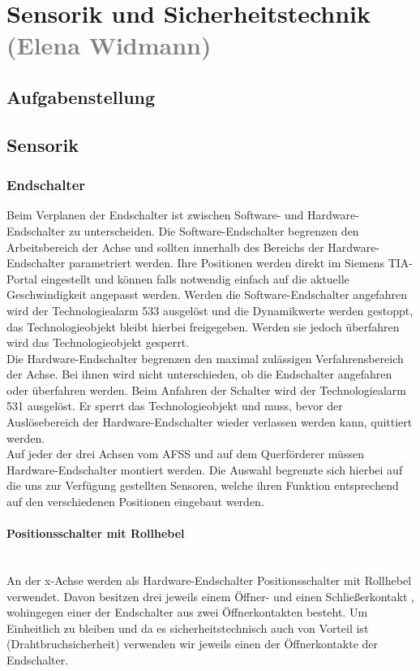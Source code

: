 \section{Sensorik und Sicherheitstechnik \textcolor{gray}{(Elena Widmann)}}

\subsection{Aufgabenstellung}

\subsection{Sensorik}

\subsubsection{Endschalter}
Beim Verplanen der Endschalter ist zwischen Software- und Hardware-Endschalter zu unterscheiden. Die Software-Endschalter begrenzen den Arbeitsbereich der Achse und sollten innerhalb des Bereichs der Hardware-Endschalter parametriert werden. Ihre Positionen werden direkt im Siemens TIA-Portal eingestellt und können falls notwendig einfach auf die aktuelle Geschwindigkeit angepasst werden. Werden die Software-Endschalter angefahren wird der Technologiealarm 533 ausgelöst und die Dynamikwerte werden gestoppt, das Technologieobjekt bleibt hierbei freigegeben. Werden sie jedoch überfahren wird das Technologieobjekt gesperrt. \\
Die Hardware-Endschalter begrenzen den maximal zulässigen Verfahrensbereich der Achse. Bei ihnen wird nicht unterschieden, ob die Endschalter angefahren oder überfahren werden. Beim Anfahren der Schalter wird der Technologiealarm 531 ausgelöst. Er sperrt das Technologieobjekt und muss, bevor der Auslösebereich der Hardware-Endschalter wieder verlassen werden kann, quittiert werden. \cite{axis_manual}\\
Auf jeder der drei Achsen vom AFSS und auf dem Querförderer müssen Hardware-Endschalter montiert werden. Die Auswahl begrenzte sich hierbei auf die uns zur Verfügung gestellten Sensoren, welche ihren Funktion entsprechend auf den verschiedenen Positionen eingebaut werden.

\paragraph{Positionsschalter mit Rollhebel} \mbox{}\\
An der x-Achse werden als Hardware-Endschalter Positionsschalter mit Rollhebel verwendet. Davon besitzen drei jeweils einem Öffner- und einen Schließerkontakt \cite{schmersal_3}, wohingegen einer der Endschalter aus zwei Öffnerkontakten besteht. \cite{schmersal_1} Um Einheitlich zu bleiben und da es sicherheitstechnisch auch von Vorteil ist (Drahtbruchsicherheit) verwenden wir jeweils einen der Öffnerkontakte der Endschalter.

